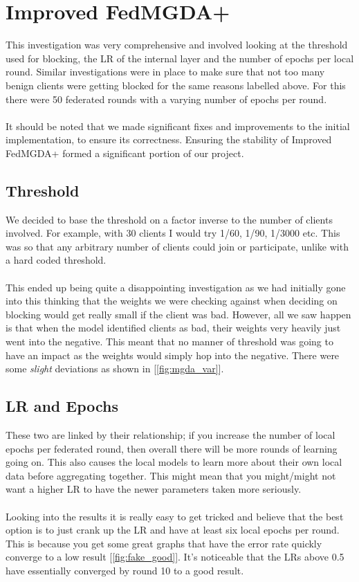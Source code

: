 \section{Improved FedMGDA+}
This investigation was very comprehensive and involved looking at the threshold used for blocking, the LR of the internal layer and the number of epochs per local round. 
Similar investigations were in place to make sure that not too many benign clients were getting blocked for the same reasons labelled above.
For this there were 50 federated rounds with a varying number of epochs per round.
\\ \\
It should be noted that we made significant fixes and improvements to the initial implementation, to ensure its correctness. Ensuring the stability of Improved FedMGDA+ formed a significant portion of our project.

\subsection{Threshold}
We decided to base the threshold on a factor inverse to the number of clients involved.
For example, with 30 clients I would try 1/60, 1/90, 1/3000 etc.
This was so that any arbitrary number of clients could join or participate, unlike with a hard coded threshold.
\\ \\
This ended up being quite a disappointing investigation as we had initially gone into this thinking that the weights we were checking against when deciding on blocking would get really small if the client was bad. 
However, all we saw happen is that when the model identified clients as bad, their weights very heavily just went into the negative.
This meant that no manner of threshold was going to have an impact as the weights would simply hop into the negative.
There were some \textit{slight} deviations as shown in [\ref{fig:mgda_var}].

\subsection{LR and Epochs}
These two are linked by their relationship; if you increase the number of local epochs per federated round, then overall there will be more rounds of learning going on. 
This also causes the local models to learn more about their own local data before aggregating together. 
This might mean that you might/might not want a higher LR to have the newer parameters taken more seriously.
\\ \\
Looking into the results it is really easy to get tricked and believe that the best option is to just crank up the LR and have at least six local epochs per round. 
This is because you get some great graphs that have the error rate quickly converge to a low result [\ref{fig:fake_good}].
It's noticeable that the LRs above 0.5 have essentially converged by round 10 to a good result.

